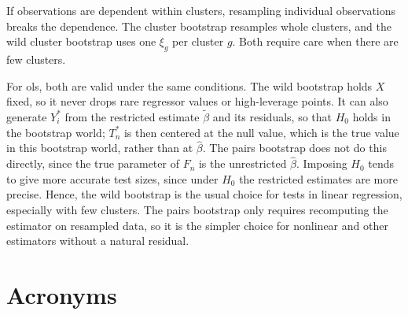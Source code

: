 \documentclass[a4paper,12pt]{article}
\begin{document}
\begin{remark}
	If observations are dependent within clusters, resampling individual observations breaks the dependence.
	The cluster bootstrap resamples whole clusters, and the wild cluster bootstrap uses one $\xi_g$ per cluster $g$.
	Both require care when there are few clusters.
\end{remark}

\begin{remark}
	For \gls{ols}, both are valid under the same conditions.
	The wild bootstrap holds $X$ fixed, so it never drops rare regressor values or high-leverage points.
	It can also generate $Y_i^*$ from the restricted estimate $\widetilde\beta$ and its residuals, so that $H_0$ holds in the bootstrap world;
	$T_n^*$ is then centered at the null value, which is the true value in this bootstrap world, rather than at $\widehat\beta$.
	The pairs bootstrap does not do this directly, since the true parameter of $F_n$ is the unrestricted $\widehat\beta$.
	Imposing $H_0$ tends to give more accurate test sizes, since under $H_0$ the restricted estimates are more precise.
	Hence, the wild bootstrap is the usual choice for tests in linear regression, especially with few clusters.
	The pairs bootstrap only requires recomputing the estimator on resampled data,
	so it is the simpler choice for nonlinear and other estimators without a natural residual.
\end{remark}

\vfill
\section*{Acronyms}
\printglossaries

{\sloppy\printbibliography[heading=bibintoc,title={References}]}
\end{document}
